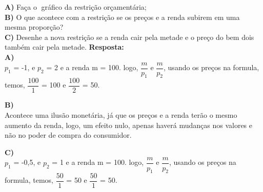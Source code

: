\documentclass[a4paper, 12pt]{article} %
\begin{document}
\begin{flushleft}
\singlespacing
\textbf{A)} Faça o gráfico da restrição orçamentária;
\\
\textbf{B)} O que acontece com a restrição se os preços e a renda subirem em uma mesma proporção?
\\
\textbf{C)} Desenhe a nova restrição se a renda cair pela metade e o preço do bem dois também cair pela metade.
\singlespacing
\textbf{Resposta:}
\\
\textbf{A)} 
\\
$p_{1}$ = -1, e $p_{2}$ = 2 e a renda m = 100.
\singlespacing
logo, $\dfrac{m}{p_{1}}$ e $\dfrac{m}{p_{2}}$, usando os preços na formula, temos, $\dfrac{100}{1}$ = 100 e $\dfrac{100}{2}$ = 50.


\begin{center}

\end{center}
\singlespacing
\textbf{B)}
\\
 Acontece uma ilusão monetária, já que os preços e a renda terão o mesmo aumento da renda, logo, um efeito nulo, apenas haverá mudanças nos valores e não no poder de compra do consumidor.
\singlespacing

\textbf{C)}
\\
$p_{1}$ = -0,5, e $p_{2}$ = 1 e a renda m = 100.
\singlespacing
logo, $\dfrac{m}{p_{1}}$ e $\dfrac{m}{p_{2}}$, usando os preços na formula, temos, $\dfrac{50}{1}$ = 50 e $\dfrac{50}{1}$ = 50. 

\begin{center}

\begin{tikzpicture}[scale=0.5, axis/.style={very thick, ->, >=stealth'}, important line/.style={thick}, dashed line/.style={dashed, thin}, pile/.style={thick, ->, >=stealth', shorten <=2pt, shorten >=2pt}, every node/.style={color=black}]


\end{tikzpicture}
\end{center}
\end{flushleft}
\end{document}
